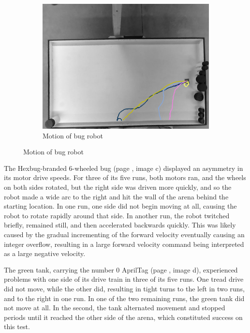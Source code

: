 \begin{figure}
	\begin{subfigure}[t]{0.47\textwidth}
		\includegraphics[width=\textwidth]{../hardwareX_paper/robot_5.png}
		\caption{Motion of bug robot}
	\end{subfigure}
	\label{img_traj}	
\end{figure}

The Hexbug-branded 6-wheeled bug (page \pageref{img_traj}, image c) displayed an asymmetry in its motor drive speeds. 
For three of its five runs, both motors ran, and the wheels on both sides rotated, but the right side was driven more quickly, and so the robot made a wide arc to the right and hit the wall of the arena behind the starting location. 
In one run, one side did not begin moving at all, causing the robot to rotate rapidly around that side. 
In another run, the robot twitched briefly, remained still, and then accelerated backwards quickly. 
This was likely caused by the gradual incrementing of the forward velocity eventually causing an integer overflow, resulting in a large forward velocity command being interpreted as a large negative velocity.

The green tank, carrying the number 0 AprilTag (page \pageref{img_traj}, image d), experienced problems with one side of its drive train in three of its five runs.
One tread drive did not move, while the other did, resulting in tight turns to the left in two runs, and to the right in one run. In one of the two remaining runs, the green tank did not move at all. In the second, the tank alternated movement and stopped periods until it reached the other side of the arena, which constituted success on this test. 


